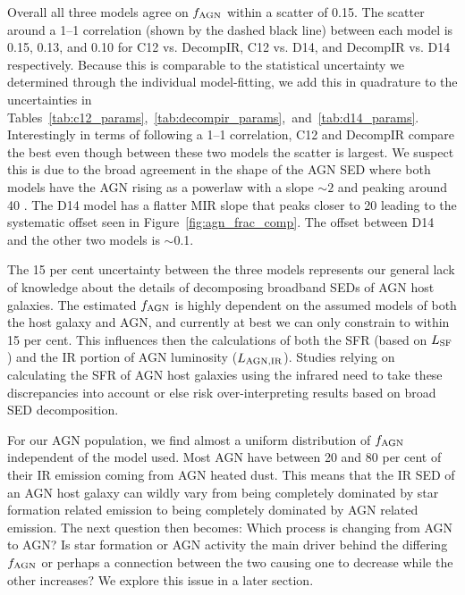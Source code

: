 \documentclass[fleqn, usenatbib]{mnras}
\begin{document}
Overall all three models agree on $f_{\rm AGN}$ within a scatter of 0.15. The scatter around a 1--1 correlation (shown by the dashed black line) between each model is 0.15, 0.13, and 0.10 for C12 vs. DecompIR, C12 vs. D14, and DecompIR vs. D14 respectively. Because this is comparable to the statistical uncertainty we determined through the individual model-fitting, we add this in quadrature to the uncertainties in Tables~\ref{tab:c12_params},~\ref{tab:decompir_params},~and~\ref{tab:d14_params}. Interestingly in terms of following a 1--1 correlation, C12 and DecompIR compare the best even though between these two models the scatter is largest. We suspect this is due to the broad agreement in the shape of the AGN SED where both models have the AGN rising as a powerlaw with a slope $\sim2$ and peaking around 40 \micron{}. The D14 model has a flatter MIR slope that peaks closer to 20 \micron leading to the systematic offset seen in Figure~\ref{fig:agn_frac_comp}. The offset between D14 and the other two models is $\sim$0.1. 

The 15 per cent uncertainty between the three models represents our general lack of knowledge about the details of decomposing broadband SEDs of AGN host galaxies. The estimated $f_{\rm AGN}$ is highly dependent on the assumed models of both the host galaxy and AGN, and currently at best we can only constrain to within 15 per cent. This influences then the calculations of both the SFR (based on $L_{\rm SF}$) and the IR portion of AGN luminosity ($L_{\rm AGN, IR}$). Studies relying on calculating the SFR of AGN host galaxies using the infrared need to take these discrepancies into account or else risk over-interpreting results based on broad SED decomposition.

For our AGN population, we find almost a uniform distribution of $f_{\rm AGN}$ independent of the model used. Most AGN have between 20 and 80 per cent of their IR emission coming from AGN heated dust. This means that the IR SED of an AGN host galaxy can wildly vary from being completely dominated by star formation related emission to being completely dominated by AGN related emission. The next question then becomes: Which process is changing from AGN to AGN? Is star formation or AGN activity the main driver behind the differing $f_{\rm AGN}$ or perhaps a connection between the two causing one to decrease while the other increases? We explore this issue in a later section.
\end{document}
